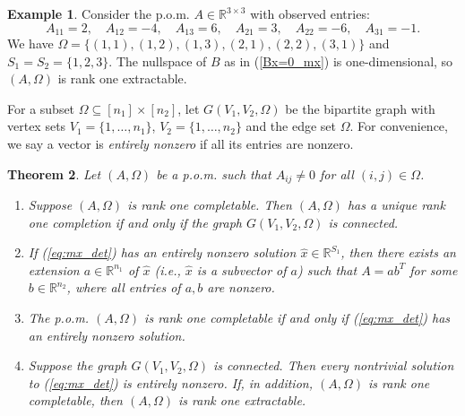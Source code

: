\documentclass{amsart}
\newcommand{\re}{\mathbb{R}}
\newcommand{\reff}[1]{(\ref{#1})}
\newcommand{\ddd}{,\ldots,}
\newcommand{\bnum}{\begin{enumerate}}
\newcommand{\enum}{\end{enumerate}}
\newtheorem{theorem}{Theorem}[section]
\theoremstyle{definition}
\newtheorem{example}[theorem]{Example}
\numberwithin{equation}{section}
\begin{document}
\begin{example}
Consider the p.o.m. $A \in \re^{3 \times 3}$ with observed entries:
\[
A_{11} = 2, \quad A_{12} = -4, \quad A_{13} = 6, \quad A_{21} = 3, \quad A_{22} = -6, \quad A_{31} = -1.
\]
We have $\Omega = \{(1,1), (1,2), (1,3), (2,1), (2,2), (3,1)\}$ and 
$S_1 = S_2 = \{1,2,3\}$.
The nullspace of $B$ as in \reff{Bx=0_mx} is one-dimensional,
so $(A, \Omega)$ is rank one extractable.
\end{example}






For a subset $\Omega \subseteq [n_1] \times [n_2]$,
let $G(V_1, V_2, \Omega)$ be the bipartite graph with vertex sets 
$V_1= \{ 1 \ddd n_1 \}$, $V_2 = \{ 1 \ddd n_2 \}$ and the edge set $\Omega$.
For convenience, we say a vector is {\it entirely nonzero} if all its entries are nonzero.




\begin{theorem}\label{thm:det_comp}
Let $(A, \Omega)$ be a p.o.m. such that $A_{ij} \ne 0$ for all $(i,j) \in \Omega$.
\bnum

\item[(i)] Suppose $(A, \Omega)$ is rank one completable. 
Then $(A, \Omega)$ has a unique rank one completion if and only if the graph $G(V_1, V_2, \Omega)$ is connected.

\item[(ii)] If \reff{eq:mx_det} has an entirely nonzero solution $\hat{x} \in \re^{S_1}$, then 
there exists an extension $a \in \re^{n_1}$ of $\hat{x}$ (i.e., $\hat{x}$ is a subvector of $a$) such that $A = ab^T$ for some $b \in \re^{n_2}$, where all entries of $a,b$ are nonzero.

\item[(iii)] The p.o.m. $(A, \Omega)$ is rank one completable if and only if \reff{eq:mx_det} has an entirely nonzero solution.

\item[(iv)] Suppose the graph $G(V_1, V_2, \Omega)$ is connected.
Then every nontrivial solution to \reff{eq:mx_det} is entirely nonzero.
If, in addition, $(A, \Omega)$ is rank one completable, then $(A, \Omega)$ is rank one extractable.

\enum
\end{theorem}
\end{document}
